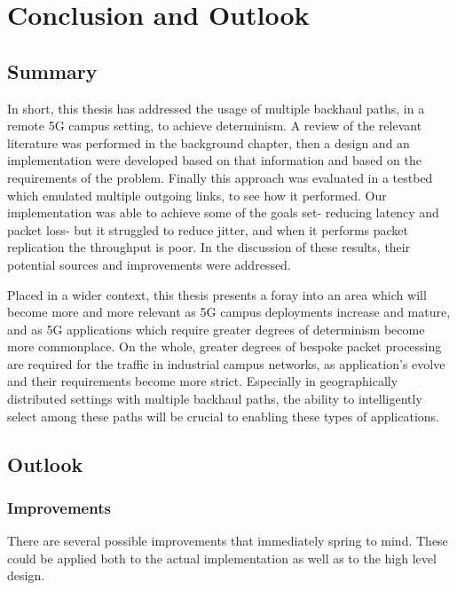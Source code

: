 
\cleardoublepage
\chapter{Conclusion and Outlook}
\label{cha:conclusion}

\section{Summary}

In short, this thesis has addressed the usage of multiple backhaul paths, in a remote 5G campus setting, to achieve determinism. A review of the relevant literature was performed in the background chapter, then a design and an implementation were developed based on that information and based on the requirements of the problem. Finally this approach was evaluated in a testbed which emulated multiple outgoing links, to see how it performed. Our implementation was able to achieve some of the goals set- reducing latency and packet loss- but it struggled to reduce jitter, and when it performs packet replication the throughput is poor. In the discussion of these results, their potential sources and improvements were addressed.

Placed in a wider context, this thesis presents a foray into an area which will become more and more relevant as 5G campus deployments increase and mature, and as 5G applications which require greater degrees of determinism become more commonplace. On the whole, greater degrees of bespoke packet processing are required for the traffic in industrial campus networks, as application's evolve and their requirements become more strict. Especially in geographically distributed settings with multiple backhaul paths, the ability to intelligently select among these paths will be crucial to enabling these types of applications.


\section{Outlook}

\subsection{Improvements}

There are several possible improvements that immediately spring to mind. These could be applied both to the actual implementation as well as to the high level design.

